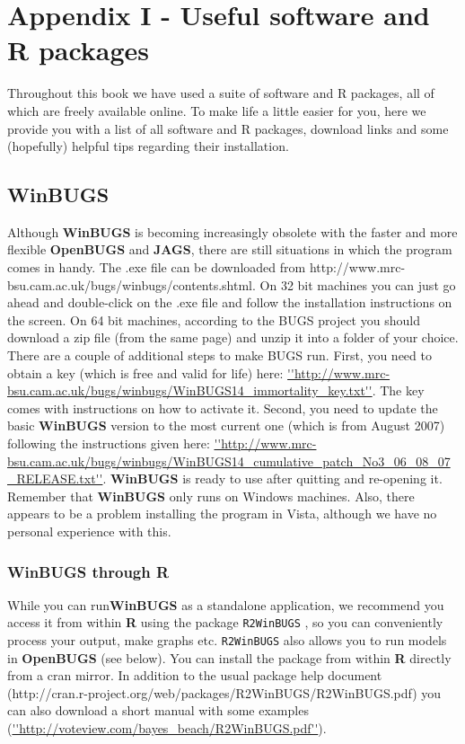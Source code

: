 
\chapter*{Appendix I - Useful software and R packages}
\label{chapt.app1}

\vspace{.3in}

Throughout this book we have used a suite of software and R packages, all of which are freely available online. To make life a little easier for you, here we provide you with a list of all software and R packages, download links and some (hopefully) helpful tips regarding their installation.  


\section{WinBUGS}
Although {\bf WinBUGS} \citep{gilks_etal:1994} is becoming increasingly obsolete with the faster and more flexible {\bf OpenBUGS} and {\bf JAGS}, there are still situations in which the program comes in handy.  
The .exe file can be downloaded from http://www.mrc-bsu.cam.ac.uk/bugs/winbugs/contents.shtml. On 32 bit machines you can just go ahead and double-click on the .exe file and follow the installation instructions on the screen.
On 64 bit machines, according to the BUGS project you should download a zip file (from the same page) and unzip it into a folder of your choice.
There are a couple of additional steps to make BUGS run. 
First, you need to obtain a key (which is free and valid for life) here: \url{''http://www.mrc-bsu.cam.ac.uk/bugs/winbugs/WinBUGS14_immortality_key.txt''}. The key comes with instructions on how to activate it.
Second, you need to update the basic {\bf WinBUGS} version to the most current one (which is from August 2007) following the instructions given here: \url{''http://www.mrc-bsu.cam.ac.uk/bugs/winbugs/WinBUGS14_cumulative_patch_No3_06_08_07_RELEASE.txt''}.
{\bf WinBUGS} is ready to use after quitting and re-opening it.
Remember that {\bf WinBUGS} only runs on Windows machines. Also, there appears to be a problem installing the program in Vista, although we have no personal experience with this.

\subsection{WinBUGS through R}
While you can run{\bf WinBUGS} as a standalone application, we recommend you access it from within {\bf R} using the package {\tt R2WinBUGS} \citep{sturtz_etal:2005}, so you can conveniently process your output, make graphs etc.   {\tt R2WinBUGS} also allows you to run models in {\bf OpenBUGS} (see below). You can install the package from within {\bf R} directly from a cran mirror. In addition to the usual package help document (http://cran.r-project.org/web/packages/R2WinBUGS/R2WinBUGS.pdf) you can also download a short manual with some examples (\url{''http://voteview.com/bayes_beach/R2WinBUGS.pdf''}). 



